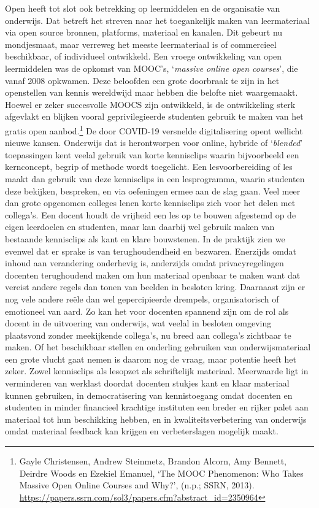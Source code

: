 \documentclass[smallauthor, chapterhaspagenum, nochapterinheader, pagenuminheader,  bigchapnum,medium2, tocpages,  garamond, titleinheader]{jote-book}
\begin{document}
	Open heeft tot slot ook betrekking op leermiddelen en de organisatie van onderwijs. Dat betreft het streven naar het toegankelijk maken van leermateriaal via open source bronnen, platforms, materiaal en kanalen. Dit gebeurt nu mondjesmaat, maar verreweg het meeste leermateriaal is of commercieel beschikbaar, of individueel ontwikkeld. Een vroege ontwikkeling van open leermiddelen was de opkomst van MOOC's, ‘\emph{massive}\emph{ online open courses}', die vanaf 2008 opkwamen. Deze beloofden een grote doorbraak te zijn in het openstellen van kennis wereldwijd maar hebben die belofte niet waargemaakt. Hoewel er zeker succesvolle MOOCS zijn ontwikkeld, is de ontwikkeling sterk afgevlakt en blijken vooral geprivilegieerde studenten gebruik te maken van het gratis open aanbod.\footnote{Gayle Christensen, Andrew Steinmetz, Brandon Alcorn, Amy Bennett, Deirdre Woods en Ezekiel Emanuel, ‘The MOOC Phenomenon: Who Takes Massive Open Online Courses and Why?', (n.p.; SSRN, 2013). \href{https://doi.org/10.1007/s40670-020-01089-7}{https://papers.ssrn.com/sol3/papers.cfm?abstract\_id=2350964}} De door COVID-19 versnelde digitalisering opent wellicht nieuwe kansen. Onderwijs dat is herontworpen voor online, hybride of ‘\emph{blended}' toepassingen kent veelal gebruik van korte kennisclips waarin bijvoorbeeld een kernconcept, begrip of methode wordt toegelicht. Een lesvoorbereiding of les maakt dan gebruik van deze kennisclips in een lesprogramma, waarin studenten deze bekijken, bespreken, en via oefeningen ermee aan de slag gaan. Veel meer dan grote opgenomen colleges lenen korte kennisclips zich voor het delen met collega's. Een docent houdt de vrijheid een les op te bouwen afgestemd op de eigen leerdoelen en studenten, maar kan daarbij wel gebruik maken van bestaande kennisclips als kant en klare bouwstenen. In de praktijk zien we evenwel dat er sprake is van terughoudendheid en bezwaren. Enerzijds omdat inhoud aan verandering onderhevig is, anderzijds omdat privacyregelingen docenten terughoudend maken om hun materiaal openbaar te maken want dat vereist andere regels dan tonen van beelden in besloten kring. Daarnaast zijn er nog vele andere reële dan wel gepercipieerde drempels, organisatorisch of emotioneel van aard. Zo kan het voor docenten spannend zijn om de rol als docent in de uitvoering van onderwijs, wat veelal in besloten omgeving plaatsvond zonder meekijkende collega's, nu breed aan collega's zichtbaar te maken. Of het beschikbaar stellen en onderling gebruiken van onderwijsmateriaal een grote vlucht gaat nemen is daarom nog de vraag, maar potentie heeft het zeker. Zowel kennisclips als lesopzet als schriftelijk materiaal. Meerwaarde ligt in verminderen van werklast doordat docenten stukjes kant en klaar materiaal kunnen gebruiken, in democratisering van kennistoegang omdat docenten en studenten in minder financieel krachtige instituten een breder en rijker palet aan materiaal tot hun beschikking hebben, en in kwaliteitsverbetering van onderwijs omdat materiaal feedback kan krijgen en verbeterslagen mogelijk maakt.
\end{document}
